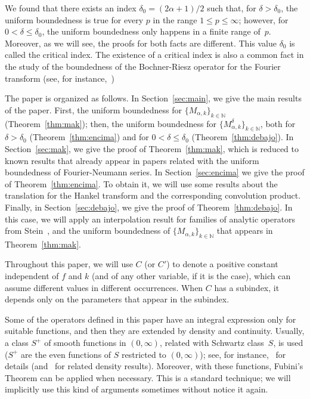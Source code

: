 \documentclass{amsart}
\theoremstyle{remark}
\newcommand{\N}{\mathbb{N}}
\newcommand{\mak}{M_{\alpha,k}}
\newcommand{\BRk}{M_{\alpha,k}^{\delta}}
\begin{document}
We found that there exists an index $\delta_0 = (2\alpha+1)/2$
such that, for $\delta > \delta_0$, the uniform boundedness is true
for every $p$ in the range $1 \le p \le \infty$; 
however, for $0 < \delta \le \delta_0$, the uniform boundedness
only happens in a finite range of~$p$.
Moreover, as we will see, the proofs for both facts are different.
This value $\delta_0$ is called the critical index. The existence of a
critical index is also a common fact in the study of the boundedness of the
Bochner-Riesz operator for the Fourier transform (see, for
instance,~\cite{StWe})



The paper is organized as follows. 
In Section~\ref{sec:main}, we give the main results of the paper. First, the
uniform boundedness for $\{\mak\}_{k\in\N}$ (Theorem~\ref{thm:mak}); then,
the uniform boundedness for $\{\BRk\}_{k\in\N}$, both for $\delta > \delta_0$
(Theorem~\ref{thm:encima}) and for $0 < \delta \le \delta_0$
(Theorem~\ref{thm:debajo}).
In Section~\ref{sec:mak}, we give the proof of Theorem~\ref{thm:mak}, which is
reduced to known results that already appear in papers related with the
uniform boundedness of Fourier-Neumann series.
In Section~\ref{sec:encima} we give the proof of Theorem~\ref{thm:encima}.
To obtain it, we will use some results about the
translation for the Hankel transform and the corresponding convolution
product. Finally, in Section~\ref{sec:debajo}, we give the proof of
Theorem~\ref{thm:debajo}. In this case, we will apply an interpolation result
for families of analytic operators from Stein~\cite{St-Int}, and the uniform
boundedness of $\{\mak\}_{k\in\N}$ that appears in Theorem~\ref{thm:mak}.

Throughout this paper, we will use $C$ (or $C'$) to denote a positive constant
independent of $f$ and $k$ (and of any other variable, if it is the case),
which can assume different values in different occurrences. When $C$ has a
subindex, it depends only on the parameters that appear in the subindex.

Some of the operators defined in this paper have an integral expression only
for suitable functions, and then they are extended by density and continuity.
Usually, a class $S^+$ of smooth functions in $(0,\infty)$, related with
Schwartz class~$S$, is used ($S^+$ are the even functions of $S$ restricted to
$(0,\infty)$); see, for instance,~\cite{Dur2,ColCTV} for details
(and~\cite{GasTr,StemTr} for related density results). Moreover, with these
functions, Fubini's Theorem can be applied when necessary. This is a standard
technique; we will implicitly use this kind of arguments sometimes without
notice it again.
\end{document}
